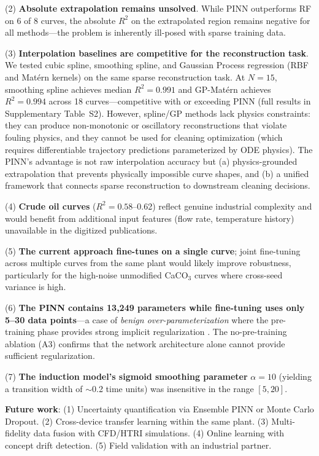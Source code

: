 \documentclass[review]{elsarticle}
\begin{document}
(2) \textbf{Absolute extrapolation remains unsolved}. While PINN outperforms RF on 6 of 8 curves, the absolute $R^2$ on the extrapolated region remains negative for all methods---the problem is inherently ill-posed with sparse training data.

(3) \textbf{Interpolation baselines are competitive for the reconstruction task}. We tested cubic spline, smoothing spline, and Gaussian Process regression (RBF and Mat\'{e}rn kernels) on the same sparse reconstruction task. At $N=15$, smoothing spline achieves median $R^2 = 0.991$ and GP-Mat\'{e}rn achieves $R^2 = 0.994$ across 18 curves---competitive with or exceeding PINN (full results in Supplementary Table~S2). However, spline/GP methods lack physics constraints: they can produce non-monotonic or oscillatory reconstructions that violate fouling physics, and they cannot be used for cleaning optimization (which requires differentiable trajectory predictions parameterized by ODE physics). The PINN's advantage is not raw interpolation accuracy but (a) physics-grounded extrapolation that prevents physically impossible curve shapes, and (b) a unified framework that connects sparse reconstruction to downstream cleaning decisions.

(4) \textbf{Crude oil curves} ($R^2 = 0.58$--0.62) reflect genuine industrial complexity and would benefit from additional input features (flow rate, temperature history) unavailable in the digitized publications.

(5) \textbf{The current approach fine-tunes on a single curve}; joint fine-tuning across multiple curves from the same plant would likely improve robustness, particularly for the high-noise unmodified CaCO$_3$ curves where cross-seed variance is high.

(6) \textbf{The PINN contains 13,249 parameters while fine-tuning uses only 5--30 data points}---a case of \textit{benign over-parameterization} where the pre-training phase provides strong implicit regularization \cite{neyshabur2015search}. The no-pre-training ablation (A3) confirms that the network architecture alone cannot provide sufficient regularization.

(7) \textbf{The induction model's sigmoid smoothing parameter} $\alpha=10$ (yielding a transition width of $\sim$0.2 time units) was insensitive in the range $[5, 20]$.

\textbf{Future work}: (1) Uncertainty quantification via Ensemble PINN or Monte Carlo Dropout. (2) Cross-device transfer learning within the same plant. (3) Multi-fidelity data fusion with CFD/HTRI simulations. (4) Online learning with concept drift detection. (5) Field validation with an industrial partner.
\end{document}
